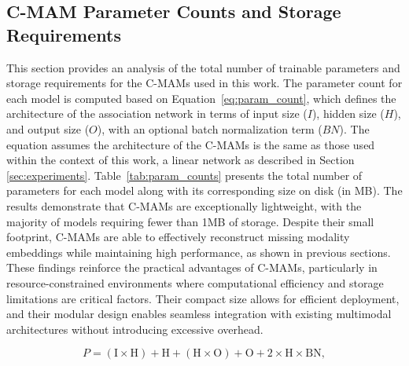 \FloatBarrier

\subsection{C-MAM Parameter Counts and Storage Requirements}
\label{sec:parameter_counts}
This section provides an analysis of the total number of trainable parameters and storage requirements for the C-MAMs used in this work. The parameter count for each model is computed based on Equation~\ref{eq:param_count}, which defines the architecture of the association network in terms of input size ($I$), hidden size ($H$), and output size ($O$), with an optional batch normalization term ($BN$). The equation assumes the architecture of the C-MAMs is the same as those used within the context of this work, a linear network as described in Section \ref{sec:experiments}. Table~\ref{tab:param_counts} presents the total number of parameters for each model along with its corresponding size on disk (in MB). The results demonstrate that C-MAMs are exceptionally lightweight, with the majority of models requiring fewer than 1MB of storage. Despite their small footprint, C-MAMs are able to effectively reconstruct missing modality embeddings while maintaining high performance, as shown in previous sections. These findings reinforce the practical advantages of C-MAMs, particularly in resource-constrained environments where computational efficiency and storage limitations are critical factors. Their compact size allows for efficient deployment, and their modular design enables seamless integration with existing multimodal architectures without introducing excessive overhead.

\begin{equation*}\label{eq:param_count}
    P = ( \text{I} \times \text{H} ) + \text{H} 
    + (\text{H} \times \text{O}) + \text{O} 
    + 2 \times \text{H} \times \text{BN},
\end{equation*}

